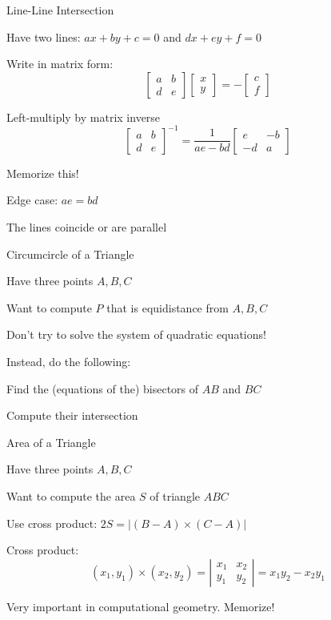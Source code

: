 \documentclass[13pt,onlymath]{beamer}
\begin{document}
\begin{frame}{Line-Line Intersection}
\BIT
\item Have two lines: $ax+by+c=0$ and $dx+ey+f=0$
\item Write in matrix form:
\[
\left[ \begin{array}{cc} a & b \\ d & e \end{array}\right]
\left[ \begin{array}{c} x \\ y \end{array}\right]
=
-\left[ \begin{array}{c} c \\ f \end{array}\right]
\]
\item Left-multiply by matrix inverse
\[
\left[ \begin{array}{cc} a & b \\ d & e \end{array}\right]^{-1} =
\frac{1}{ae-bd}\left[ \begin{array}{cc} e & -b \\ -d & a \end{array}\right]
\]
\BIT
\item Memorize this!
\EIT
\item Edge case: $ae=bd$
\BIT
\item The lines coincide or are parallel
\EIT
\EIT
\end{frame}

\begin{frame}{Circumcircle of a Triangle}
\BIT
\item Have three points $A, B, C$
\item Want to compute $P$ that is equidistance from $A, B, C$

\item Don't try to solve the system of quadratic equations!
\item Instead, do the following:
\BIT
\item Find the (equations of the) bisectors of $AB$ and $BC$
\item Compute their intersection
\EIT
\EIT
\end{frame}

\begin{frame}{Area of a Triangle}
\BIT
\item Have three points $A, B, C$
\item Want to compute the area $S$ of triangle $ABC$
\item Use cross product: $2S = |(B-A) \times (C-A)|$
\item Cross product:
\[
(x_1, y_1) \times (x_2, y_2) = \left| \begin{array}{cc} x_1 & x_2 \\ y_1 & y_2 \end{array}\right| = x_1 y_2 - x_2 y_1
\]
\BIT
\item Very important in computational geometry. Memorize!
\EIT
\EIT
\end{frame}
\end{document}
